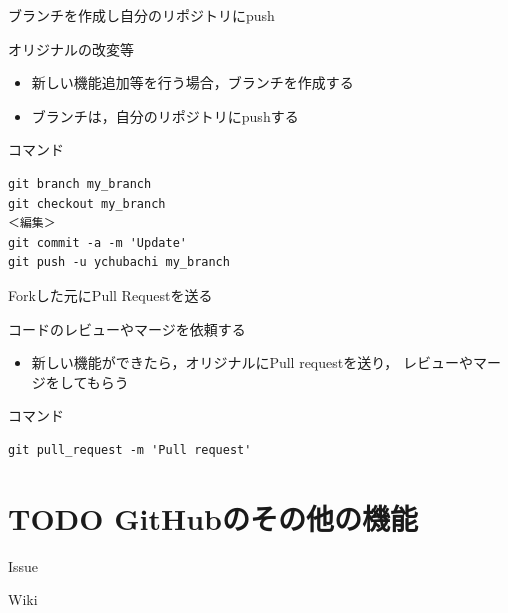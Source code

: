 \documentclass[t, aspectratio=169]{beamer}
\begin{document}
\begin{frame}[fragile,label=sec-4-2-2]{ブランチを作成し自分のリポジトリにpush}
 \begin{block}{オリジナルの改変等}
\begin{itemize}
\item 新しい機能追加等を行う場合，ブランチを作成する
\item ブランチは，自分のリポジトリにpushする
\end{itemize}
\end{block}
\begin{block}{コマンド}
\begin{verbatim}
git branch my_branch
git checkout my_branch
＜編集＞
git commit -a -m 'Update'
git push -u ychubachi my_branch
\end{verbatim}
\end{block}
\end{frame}

\begin{frame}[fragile,label=sec-4-2-3]{Forkした元にPull Requestを送る}
 \begin{block}{コードのレビューやマージを依頼する}
\begin{itemize}
\item 新しい機能ができたら，オリジナルにPull requestを送り，
レビューやマージをしてもらう
\end{itemize}
\end{block}
\begin{block}{コマンド}
\begin{verbatim}
git pull_request -m 'Pull request'
\end{verbatim}
\end{block}
\end{frame}


\section{{\bfseries\sffamily TODO} GitHubのその他の機能}
\label{sec-4-3}
\begin{frame}[label=sec-4-3-1]{Issue}
\end{frame}
\begin{frame}[label=sec-4-3-2]{Wiki}
\end{frame}
\end{document}
